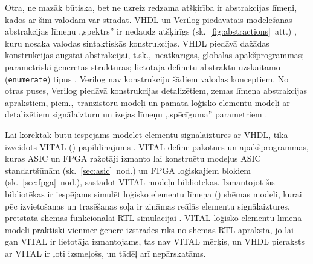 	Otra, ne mazāk būtiska, bet ne uzreiz redzama atšķirība ir abstrakcijas
	līmeņi, kādos ar šim valodām var strādāt. VHDL un Verilog piedāvātais
	modelēšanas abstrakcijas līmeņu ,,spektrs'' ir nedaudz atšķirīgs
	(sk.~\ref{fig:abstractions}~att.) \cite{vhdl-vs-verilog}, kuru nosaka
	valodas sintaktiskās konstrukcijas. VHDL piedāvā dažādas konstrukcijas
	augstai abstrakcijai, t.sk.,~neatkarīgas, globālas apakšprogrammas;
	parametriski ģenerētas struktūras; lietotāja definētu abstraktu uzskaitāmo
	(\texttt{enumerate}) tipus \cite{Mealy-VHDL}\cite{Perry-VHDL}. Verilog nav konstrukciju šādiem valodas
	konceptiem. No otras puses, Verilog piedāvā konstrukcijas detalizētiem, zemas
	līmeņa abstrakcijas aprakstiem, piem.,~tranzistoru modeļi un
	pamata loģisko elementu modeļi ar detalizētiem signālaizturu un izejas
	līmeņu ,,spēcīguma'' parametriem \cite{vhdl-vs-verilog}\cite{Kumar-Verilog}.
	
	Lai korektāk būtu iespējams modelēt elementu signālaiztures ar VHDL,
	tika izveidots VITAL ()
	papildinājums \cite{VITAL}. VITAL definē pakotnes un apakšprogrammas,
	kuras ASIC un FPGA ražotāji izmanto lai konstruētu modeļus
	ASIC standartšūnām (sk.~\ref{sec:asic}~nod.) un FPGA loģiskajiem blokiem
	(sk.~\ref{sec:fpga}~nod.), sastādot VITAL modeļu bibliotēkas.
	Izmantojot šīs bibliotēkas ir iespējams simulēt loģisko elementu līmeņa
	() shēmas modeli, kurai pēc izvietošanas un trasēšanas
	soļa ir zināmas reālās elementu signālaiztures, pretstatā shēmas 
	funkcionālai RTL simulācijai \cite{Perry-VHDL}.
	VITAL loģisko elementu līmeņa modeli praktiski vienmēr ģenerē izstrādes
	rīks no shēmas RTL apraksta, jo	
	lai gan VITAL ir
	lietotāja izmantojams, tas nav VITAL mērķis, un VHDL pieraksts ar VITAL
	ir ļoti izsmeļošs, un tādēļ arī nepārskatāms.
	
